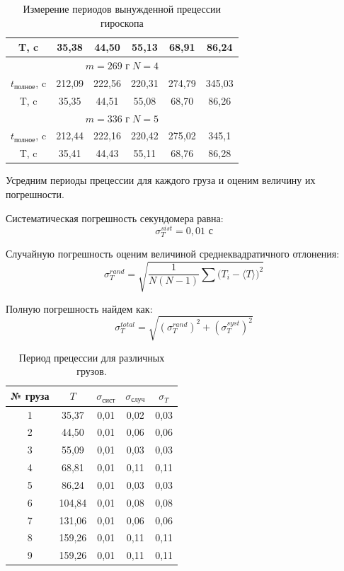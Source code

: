 \documentclass[12pt]{article}
\begin{document}
\begin{table}[h!]
\begin{center}
\begin{tabular}{|c|c|c|c|c|c|}
			T, c & 35,38 & 44,50 & 55,13 & 68,91 & 86,24 \\ \hline
			\multicolumn{6}{|c|}{$m = 269 \text{ г}\; N = 4$}                                                     \\ \hline
			$t_{\text{полное}}$, c    & 212,09 & 222,56 & 220,31 & 274,79 & 345,03  \\ \hline
			T, c & 35,35 & 44,51 & 55,08 & 68,70 & 86,26 \\ \hline
			\multicolumn{6}{|c|}{$m = 336 \text{ г}\; N = 5$}                                                      \\ \hline
			$t_{\text{полное}}$, c & 212,44 & 222,16 & 220,42 & 275,02 & 345,1 \\ \hline
			T, c & 35,41 & 44,43 & 55,11 & 68,76 & 86,28 \\ \hline
		\end{tabular}
		\caption{Измерение периодов вынужденной прецессии гироскопа}
		\label{tab:time_and_count_of_rev}
	\end{center}
\end{table}

Усредним периоды прецессии для каждого груза и оценим величину их погрешности.

Систематическая погрешность секундомера равна:
$$\sigma_T^{sist} = 0,01 \text{ с}$$


Случайную погрешность оценим величиной среднеквадратичного отлонения:
$$\sigma_T^{rand} = \sqrt{\frac{1}{N(N - 1)}\sum{(T_i - \langle T \rangle})^2}$$

Полную погрешность найдем как:
$$\sigma_T^{total} = \sqrt{(\sigma_T^{rand})^2 + (\sigma_T^{syst})^2}$$


\begin{table}[h]
	\begin{center}
		\begin{tabular}{|c|c|c|c|c|}
			\hline
			№ груза & $T$ & $\sigma_{\text{сист}}$ & $\sigma_{\text{случ}}$ & $\sigma_{T}$ \\ \hline
			1       & 35,37  & 0,01       & 0,02       & 0,03    \\ \hline
			2       & 44,50  & 0,01       & 0,06       & 0,06    \\ \hline
			3       & 55,09  & 0,01       & 0,03       & 0,03    \\ \hline
			4       & 68,81  & 0,01       & 0,11       & 0,11    \\ \hline
			5       & 86,24  & 0,01       & 0,03       & 0,03    \\ \hline
			6       & 104,84 & 0,01       & 0,08       & 0,08    \\ \hline
			7       & 131,06 & 0,01       & 0,06       & 0,06    \\ \hline
			8       & 159,26 & 0,01       & 0,11       & 0,11    \\ \hline
			9       & 159,26 & 0,01       & 0,11       & 0,11    \\ \hline
		\end{tabular}
		\caption{Период прецессии для различных грузов.}
		\label{tab:periods_and_sigma}
	\end{center}
\end{table}
\end{document}
